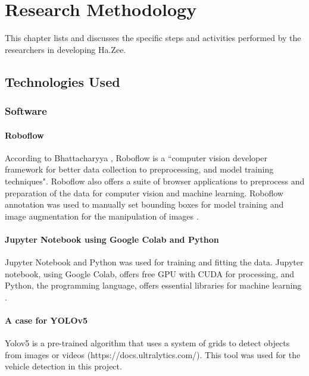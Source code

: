 \chapter{Research Methodology}
This chapter lists and discusses the specific steps and activities performed by the researchers in developing Ha.Zee.

\section{Technologies Used}

\subsection{Software}

\subsubsection{Roboflow}
According to Bhattacharyya \citeyear{Bhattacharyya_2020}, Roboflow is a ``computer vision developer framework for better data collection to preprocessing, and model training techniques". Roboflow also offers a suite  of browser applications to preprocess and preparation of the data for computer vision and machine learning. Roboflow annotation was used to manually set bounding boxes for model training and image augmentation for the manipulation of images \cite{roboflow}.

\subsubsection{Jupyter Notebook using Google Colab and Python}
Jupyter Notebook and Python was used for training and fitting the data. Jupyter notebook, using Google Colab,  offers free GPU with CUDA for processing, and Python, the programming language, offers essential libraries for machine learning \cite{googlecolab}.

\subsubsection{A case  for YOLOv5}
Yolov5 is a pre-trained algorithm that uses a system of grids to detect objects from images or videos (https://docs.ultralytics.com/). This tool was used for the vehicle detection in this project. 


